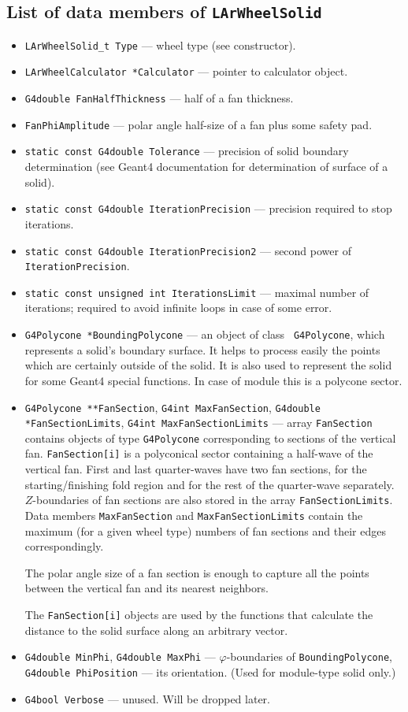 \documentclass{article}
\begin{document}
\subsection{List of data members of {\tt LArWheelSolid}}
\begin{itemize}
\item {\tt LArWheelSolid\_t Type} --- wheel type (see constructor).
\item {\tt LArWheelCalculator *Calculator} --- pointer to calculator object.
\item {\tt G4double FanHalfThickness} --- half of a fan thickness.
\item {\tt FanPhiAmplitude} --- polar angle half-size of a fan plus some safety
pad.
\item {\tt static const G4double Tolerance} --- precision of solid boundary
determination (see Geant4 documentation for determination of surface of a
solid).
\item {\tt static const G4double IterationPrecision} --- precision required to
stop iterations.
\item {\tt static const G4double IterationPrecision2} --- second power of
{\tt IterationPrecision}. 
\item {\tt static const unsigned int IterationsLimit} --- maximal number of
iterations; required to avoid infinite loops in case of some error.
\item {\tt G4Polycone *BoundingPolycone} --- an object of class {\tt
G4Polycone}, which represents 
a solid's boundary surface. It helps to process easily the points which are
certainly outside of the solid. It is also used to represent the solid for 
some Geant4 special functions. In case of module this is a polycone sector.

\item {\tt G4Polycone **FanSection}, {\tt G4int MaxFanSection},
{\tt G4double *FanSectionLimits}, {\tt G4int MaxFanSectionLimits} ---
array {\tt FanSection} contains objects of type {\tt G4Polycone}
corresponding to sections of the vertical fan.
{\tt FanSection[i]} is a polyconical sector containing a
half-wave of the vertical fan. First and last quarter-waves have two fan
sections, for the starting/finishing fold region and for the rest of the
quarter-wave separately. $Z$-boundaries of fan sections 
are also stored in the array {\tt FanSectionLimits}. Data members
{\tt MaxFanSection} and {\tt MaxFanSectionLimits} contain the maximum (for a
given wheel type) numbers of fan sections and their edges correspondingly.

The polar angle size of a fan section is enough to capture all the points 
between the vertical fan and its nearest neighbors.

The {\tt FanSection[i]} objects are used by the functions that calculate the
distance to the solid surface along an arbitrary vector.
\item {\tt G4double MinPhi}, {\tt G4double MaxPhi} --- $\varphi$-boundaries
of {\tt BoundingPolycone}, {\tt G4double PhiPosition} --- its orientation. (Used
for module-type solid only.)
\item {\tt G4bool Verbose} --- unused. Will be dropped later.
\end{itemize}
\end{document}
